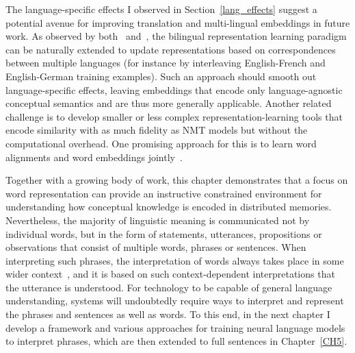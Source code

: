 The language-specific effects I observed in Section~\ref{lang_effects} suggest a potential avenue for improving translation and multi-lingual embeddings in future work. As observed by both~\cite{Hermann:2014:ICLR} and~\cite{faruqui2014improving}, the bilingual representation learning paradigm can be naturally extended to update representations based on correspondences between multiple languages (for instance by interleaving English-French and English-German training examples). Such an approach should smooth out language-specific effects, leaving embeddings that encode only language-agnostic conceptual semantics and are thus more generally applicable. Another related challenge is to develop smaller or less complex representation-learning tools that encode similarity with as much fidelity as NMT models but without the computational overhead. One promising approach for this is to learn word alignments and word embeddings jointly~\citep{Kocisky:2014}. 

Together with a growing body of work, this chapter demonstrates that a focus on word representation can provide an instructive constrained environment for understanding how conceptual knowledge is encoded in distributed memories. Nevertheless, the majority of linguistic meaning is communicated not by individual words, but in the form of statements, utterances, propositions or observations that consist of multiple words, phrases or sentences. When interpreting such phrases, the interpretation of words always takes place in some wider context~\cite{marslen1980temporal}, and it is based on such context-dependent interpretations that the utterance is understood. For technology to be capable of general language understanding, systems will undoubtedly require ways to interpret and represent the phrases and sentences as well as words. To this end, in the next chapter I develop a framework and various approaches for training neural language models to interpret phrases, which are then extended to full sentences in Chapter~\ref{CH5}. 


